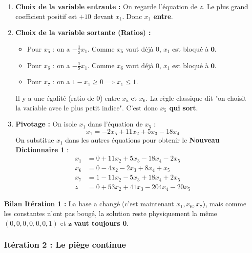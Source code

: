 \documentclass[12pt,a4paper]{article}
\begin{document}
\begin{enumerate}
    \item \textbf{Choix de la variable entrante :} 
    On regarde l'équation de $z$. Le plus grand coefficient positif est \textbf{$+10$} devant $x_1$. Donc \textbf{$x_1$ entre}.

    \item \textbf{Choix de la variable sortante (Ratios) :}
    \begin{itemize}
        \item Pour $x_5$ : on a $-\frac{1}{2}x_1$. Comme $x_5$ vaut déjà $0$, $x_1$ est bloqué à $\mathbf{0}$.
        \item Pour $x_6$ : on a $-\frac{1}{2}x_1$. Comme $x_6$ vaut déjà $0$, $x_1$ est bloqué à $\mathbf{0}$.
        \item Pour $x_7$ : on a $1 - x_1 \geq 0 \implies x_1 \leq 1$.
    \end{itemize}
    Il y a une égalité (ratio de $0$) entre $x_5$ et $x_6$. La règle classique dit "on choisit la variable avec le plus petit indice". C'est donc \textbf{$x_5$ qui sort}.

    \item \textbf{Pivotage :} 
    On isole $x_1$ dans l'équation de $x_5$ :
    $$x_1 = -2x_5 + 11x_2 + 5x_3 - 18x_4$$
    On substitue $x_1$ dans les autres équations pour obtenir le \textbf{Nouveau Dictionnaire 1} :
    \begin{align*}
    x_1 &= 0 + 11x_2 + 5x_3 - 18x_4 - 2x_5\\
    x_6 &= 0 - 4x_2 - 2x_3 + 8x_4 + x_5\\
    x_7 &= 1 - 11x_2 - 5x_3 + 18x_4 + 2x_5\\
    z &= 0 + 53x_2 + 41x_3 - 204x_4 - 20x_5
    \end{align*}
\end{enumerate}
\textbf{Bilan Itération 1 :} La base a changé (c'est maintenant $x_1, x_6, x_7$), mais comme les constantes n'ont pas bougé, la solution reste physiquement la même $(0,0,0,0,0,0,1)$ et $\mathbf{z}$ \textbf{vaut toujours 0}.

\hrulefill

\subsubsection*{Itération 2 : Le piège continue}
\end{document}
